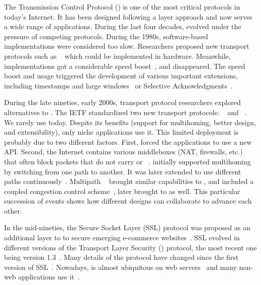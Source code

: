 The Transmission Control Protocol (\tcp) \cite{rfc793} is one of the most
critical protocols in today's Internet. It has been designed following a 
layer approach and now serves a wide range of 
applications. During the last four decades, \tcp evolved under 
the pressure of competing protocols. During the 1980s, software-based \tcp
implementations were considered too slow. Researchers proposed new transport
protocols such as \xtp~\cite{sanders1990xpress} which could be implemented in
hardware. Meanwhile, \tcp implementations got a considerable speed
boost~\cite{clark1989analysis}, and \xtp disappeared. The \tcp speed boost and
usage triggered the development of various important \tcp extensions, including
timestamps and large windows~\cite{rfc1323} or Selective
Acknowledgments~\cite{rfc2018}.

During the late nineties, early 2000s, transport protocol researchers explored
alternatives to \tcp. The IETF standardized two new transport protocols:
\dccp~\cite{kohler2006designing} and \sctp~\cite{rfc4960}. We rarely use \dccp
today. Despite its benefits (support for multihoming, better design, and
extensibility), only niche applications use it. This limited deployment is
probably due to two different factors. First, \sctp forced the applications to %
use a new API. Second, the Internet contains various middleboxes (NAT,
firewalls, etc.) that often block packets that do not carry \tcp or
\udp~\cite{honda2011still}.  \sctp initially supported multihoming by switching
from one path to another. It was later extended to use different
paths continuously~\cite{iyengar2006concurrent}.  Multipath
\tcp~\cite{rfc6824,raiciu2012hard} brought similar capabilities to \tcp, and
included a coupled congestion control scheme~\cite{wischik2011design}, later
brought to \sctp as well. This particular succession of events shows how
different designs can collaborate to advance each other.

In the mid-nineties, the Secure Socket Layer (SSL) protocol was proposed as an
additional layer to \tcp to
secure emerging e-commerce websites~\cite{draft-hickman-netscape-ssl}. SSL
evolved in different versions of the Transport Layer Security (\tls) protocol,
the most recent one being version 1.3~\cite{rfc8446}. Many details of the \tls
protocol have changed since the first version of SSL~\cite{kotzias2018coming}.
Nowadays, \tls is almost ubiquitous on web servers~\cite{holz2019era} and many non-web applications use it~\cite{anderson2019tls}.

